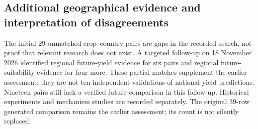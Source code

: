 \subsection{Additional geographical evidence and interpretation of disagreements}
\label{sec:litfollowup}
The initial 29 unmatched crop--country pairs are gaps in the recorded search, not proof that relevant research does
not exist. A targeted follow-up on 18 November 2026 identified regional future-yield evidence for six pairs and
regional future-suitability evidence for four more. These partial matches supplement the earlier assessment;
they are not ten independent validations of national yield predictions. Nineteen pairs still lack a verified
future comparison in this follow-up. Historical experiments and mechanism studies are recorded separately.
The original 39-row generated comparison remains the earlier assessment; its count is not silently replaced.

